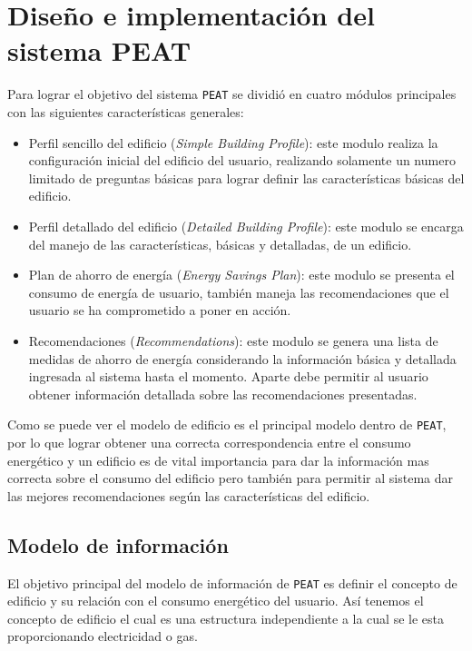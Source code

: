 \chapter{Diseño e implementación del sistema PEAT}

Para lograr el objetivo del sistema \texttt{PEAT} se dividió en cuatro
módulos principales con las siguientes características generales:

\begin{itemize}
\item Perfil sencillo del edificio (\textit{Simple Building Profile}): este modulo
  realiza la configuración inicial del edificio del usuario, realizando solamente
  un numero limitado de preguntas básicas para lograr definir las características
  básicas del edificio.
\item Perfil detallado del edificio (\textit{Detailed Building Profile}):
  este modulo se encarga del manejo de las características, básicas y detalladas,
  de un edificio.
\item Plan de ahorro de energía (\textit{Energy Savings Plan}): este modulo se
  presenta el consumo de energía de usuario, también maneja las recomendaciones
  que el usuario se ha comprometido a poner en acción.
\item Recomendaciones (\textit{Recommendations}): este modulo se genera una lista
  de medidas de ahorro de energía considerando la información básica y detallada
  ingresada al sistema hasta el momento. Aparte debe permitir al usuario obtener
  información detallada sobre las recomendaciones presentadas.
\end{itemize}

Como se puede ver el modelo de edificio es el principal modelo dentro de
\texttt{PEAT}, por lo que lograr obtener una correcta correspondencia entre
el consumo energético y un edificio es de vital importancia para dar la
información mas correcta sobre el consumo del edificio pero también para
permitir al sistema dar las mejores recomendaciones según las características
del edificio.

\section{Modelo de información}

El objetivo principal del modelo de información de \texttt{PEAT} es definir el
concepto de edificio y su relación con el consumo energético del usuario. Así
tenemos el concepto de edificio el cual es una estructura independiente a la
cual se le esta proporcionando electricidad o gas.

